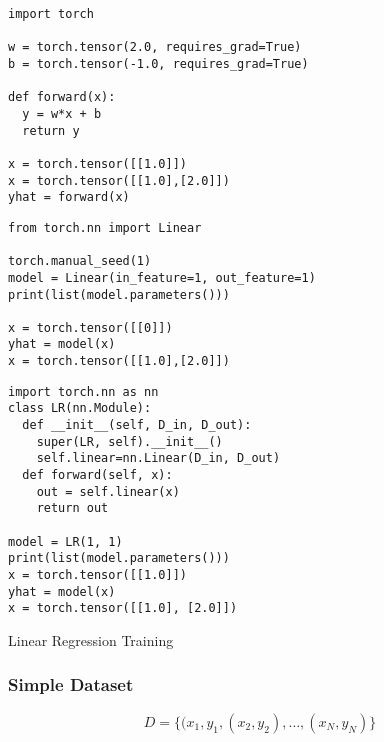 \documentclass[14 pt]{beamer}
\begin{document}
\begin{frame}[fragile]
  \begin{block}{}
\begin{verbatim}
import torch

w = torch.tensor(2.0, requires_grad=True)
b = torch.tensor(-1.0, requires_grad=True)

def forward(x): 
  y = w*x + b
  return y

x = torch.tensor([[1.0]])
x = torch.tensor([[1.0],[2.0]])
yhat = forward(x)
\end{verbatim}
  \end{block}
\end{frame}

\begin{frame}[fragile]
  \begin{block}{}
\begin{verbatim}
from torch.nn import Linear

torch.manual_seed(1)
model = Linear(in_feature=1, out_feature=1)
print(list(model.parameters()))

x = torch.tensor([[0]])
yhat = model(x)
x = torch.tensor([[1.0],[2.0]])
\end{verbatim}
  \end{block}
\end{frame}

\begin{frame}[fragile]
  \begin{block}{}
\begin{verbatim}
import torch.nn as nn
class LR(nn.Module):
  def __init__(self, D_in, D_out):
    super(LR, self).__init__()
    self.linear=nn.Linear(D_in, D_out)
  def forward(self, x):
    out = self.linear(x)
    return out

model = LR(1, 1)
print(list(model.parameters()))
x = torch.tensor([[1.0]])
yhat = model(x)
x = torch.tensor([[1.0], [2.0]])
\end{verbatim}
  \end{block}
\end{frame}

\begin{frame}
\begin{center}
\Large{Linear Regression Training}
\end{center}
\end{frame}

\begin{frame}
  \frametitle{Simple Dataset}
  \begin{equation*}
    D = \{(x_1, y_1, (x_2, y_2), \ldots, (x_N, y_N)\}
  \end{equation*}
\end{frame}
\end{document}
